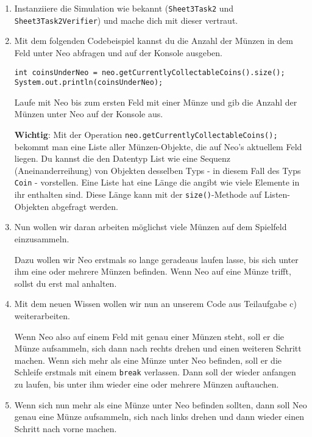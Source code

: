 
\begin{enumerate}
	\item
	Instanziiere die Simulation wie bekannt (\lstinline{Sheet3Task2} und \lstinline{Sheet3Task2Verifier}) und mache dich mit dieser vertraut.

	\item
		Mit dem folgenden Codebeispiel kannst du die Anzahl der Münzen in dem Feld unter Neo abfragen und auf der Konsole ausgeben.

		\begin{lstlisting}
int coinsUnderNeo = neo.getCurrentlyCollectableCoins().size();
System.out.println(coinsUnderNeo);
		\end{lstlisting}

		Laufe mit Neo bis zum ersten Feld mit einer Münze und gib die Anzahl der Münzen unter Neo auf der Konsole aus.\newline

		\textbf{Wichtig}: Mit der Operation \lstinline{neo.getCurrentlyCollectableCoins();} bekommt man eine Liste aller Münzen-Objekte, die auf Neo's aktuellem Feld liegen.
		Du kannst die den Datentyp List wie eine Sequenz (Aneinanderreihung) von Objekten desselben Typs - in diesem Fall des Typs \lstinline{Coin} - vorstellen.
		Eine Liste hat eine Länge die angibt wie viele Elemente in ihr enthalten sind.
		Diese Länge kann mit der \lstinline{size()}-Methode auf Listen-Objekten abgefragt werden.

	\item
	 	Nun wollen wir daran arbeiten möglichst viele Münzen auf dem Spielfeld einzusammeln.

		Dazu wollen wir Neo erstmals so lange geradeaus laufen lasse, bis sich unter ihm eine oder mehrere Münzen befinden.
		Wenn Neo auf eine Münze trifft, sollst du erst mal anhalten.

	\item
		Mit dem neuen Wissen wollen wir nun an unserem Code aus Teilaufgabe c) weiterarbeiten.

		Wenn Neo also auf einem Feld mit genau einer Münzen steht, soll er die Münze aufsammeln, sich dann nach rechts drehen und einen weiteren Schritt machen.
		Wenn sich mehr als eine Münze unter Neo befinden, soll er die Schleife erstmals mit einem \lstinline{break} verlassen.
		Dann soll der wieder anfangen zu laufen, bis unter ihm wieder eine oder mehrere Münzen auftauchen.

	\item
		Wenn sich nun mehr als eine Münze unter Neo befinden sollten, dann soll Neo genau eine Münze aufsammeln, sich nach links drehen und dann wieder einen Schritt nach vorne machen.


\end{enumerate}
